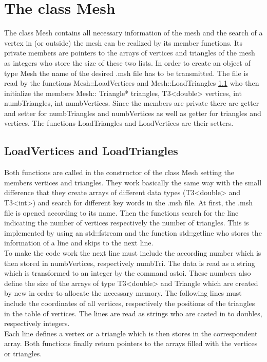 \documentclass[10pt]{article}
\begin{document}
\section{The class Mesh} \label{mesh}
The class {\ttfamily Mesh} contains all necessary information of the mesh and the search of a vertex in (or outside) the mesh can be realized by its member functions. Its private members are pointers to the arrays of vertices and triangles of the mesh as integers who store the size of these two lists.
In order to create an object of type {\ttfamily Mesh} the name of the desired .msh file has to be transmitted. The file is read by the functions {\ttfamily Mesh::LoadVertices} and {\ttfamily Mesh::LoadTriangles} \ref{Load} who then initialize the members {\ttfamily Mesh:: Triangle* triangles, T3<double> vertices, int numbTriangles, int numbVertices}.
Since the members are private there are getter and setter for {\ttfamily numbTriangles} and {\ttfamily numbVertices} as well as getter for {\ttfamily triangles} and {\ttfamily vertices}. The functions {\ttfamily LoadTriangles} and {\ttfamily LoadVertices} are their setters.


\subsection{LoadVertices and LoadTriangles} \label{Load}
Both functions are called in the constructor of the class {\ttfamily Mesh} setting the members {\ttfamily vertices} and {\ttfamily triangles}.
They work basically the same way with the small difference that they create arrays of different data types ({\ttfamily T3<double>} and {\ttfamily T3<int>}) and search for different key words in the  .msh file. 
At first, the .msh file is opened according to its name. Then the functions search for the line indicating the number of vertices respectively the number of triangles. This is implemented by using an {\ttfamily std::fstream} and the function {\ttfamily std::getline} who stores the information of a line and skips to the next line. \\
To make the code work the next line must include the according number which is then stored in {\ttfamily numbVertices}, respectively {\ttfamily numbTri}. The data is read as a string which is transformed to an integer by the command {\ttfamily astoi}. These numbers also define the size of the arrays of type {\ttfamily T3<double>} and {\ttfamily Triangle} which are created by {\ttfamily new} in order to allocate the necessary memory. The following lines must include the coordinates of all vertices, respectively the positions of the triangles in the table of vertices. The lines are read as strings who are casted in to doubles, respectively integers. \\
Each line defines a vertex or a triangle which is then stores in the correspondent array.
Both functions finally return pointers to the arrays filled with the vertices or triangles.
\end{document}
